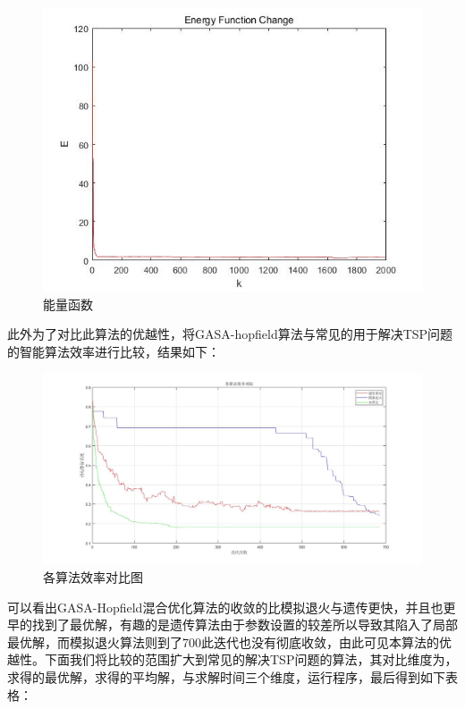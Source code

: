 \begin{figure}[H]
    \centering
    \includegraphics[width=13cm]{figure/E_diedai.jpg}
    \caption{能量函数}
    \label{fig:E_diedai}
\end{figure}
此外为了对比此算法的优越性，将GASA-hopfield算法与常见的用于解决TSP问题的智能算法效率进行比较，结果如下：
\begin{figure}[H]
    \centering
    \includegraphics[width=13cm]{figure/diedai_1.jpg}
    \caption{各算法效率对比图}
    \label{fig:diedai_1}
\end{figure}
可以看出GASA-Hopfield混合优化算法的收敛的比模拟退火与遗传更快，并且也更早的找到了最优解，有趣的是遗传算法由于参数设置的较差所以导致其陷入了局部最优解，而模拟退火算法则到了700此迭代也没有彻底收敛，由此可见本算法的优越性。下面我们将比较的范围扩大到常见的解决TSP问题的算法，其对比维度为，求得的最优解，求得的平均解，与求解时间三个维度，运行程序，最后得到如下表格：
